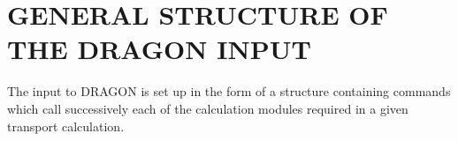 \section{GENERAL STRUCTURE OF THE DRAGON INPUT}\label{sect:GeneralStructure}

The input to DRAGON is set up in the form of a structure containing commands
which call successively each of the calculation modules required in a given
transport calculation.


